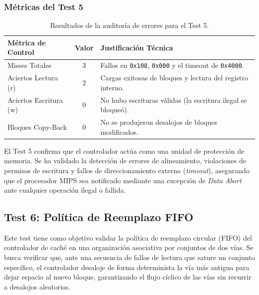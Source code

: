 \documentclass[12pt,a4paper]{article}
\begin{document}
\subsubsection{Métricas del Test 5}

\begin{table}[H]
\centering
\small
\renewcommand{\arraystretch}{1.2}
\begin{tabular}{|l|c|l|}
\hline
\rowcolor[HTML]{EFEFEF} 
\textbf{Métrica de Control} & \textbf{Valor} & \textbf{Justificación Técnica} \\ \hline
Misses Totales & 3 & Fallos en \texttt{0x108}, \texttt{0x000} y el timeout de \texttt{0x4000}. \\ \hline
Aciertos Lectura (r) & 2 & Cargas exitosas de bloques y lectura del registro interno. \\ \hline
Aciertos Escritura (w) & 0 & No hubo escrituras válidas (la escritura ilegal se bloqueó). \\ \hline
Bloques Copy-Back & 0 & No se produjeron desalojos de bloques modificados. \\ \hline
\end{tabular}
\caption{Resultados de la auditoría de errores para el Test 5.}
\label{tab:audit_test5}
\end{table}

El Test 5 confirma que el controlador actúa como una unidad de protección de memoria. Se ha validado la detección de errores de alineamiento, violaciones de permisos de escritura y fallos de direccionamiento externo (\textit{timeout}), asegurando que el procesador MIPS sea notificado mediante una excepción de \textit{Data Abort} ante cualquier operación ilegal o fallida.

\newpage

\subsection{Test 6: Política de Reemplazo FIFO}

 Este test tiene como objetivo validar la política de reemplazo circular (FIFO) del controlador de caché en una organización asociativa por conjuntos de dos vías. Se busca verificar que, ante una secuencia de fallos de lectura que sature un conjunto específico, el controlador desaloje de forma determinista la vía más antigua para dejar espacio al nuevo bloque, garantizando el flujo cíclico de las vías sin recurrir a desalojos aleatorios.
\end{document}
